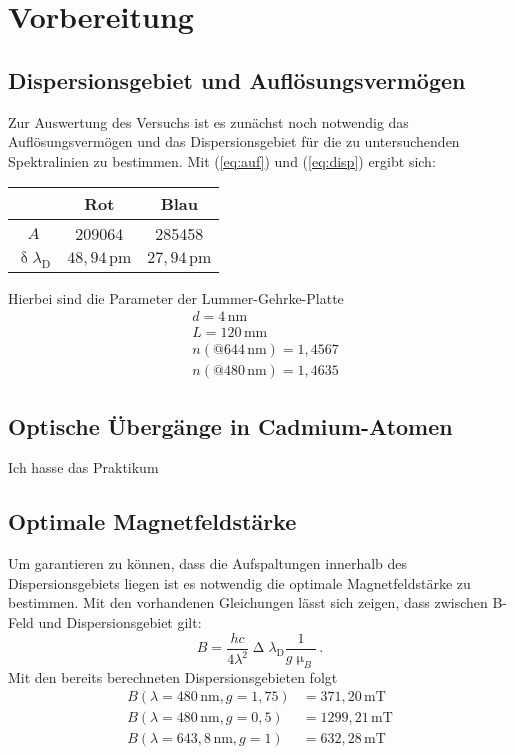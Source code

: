 \section{Vorbereitung}
\subsection{Dispersionsgebiet und Auflösungsvermögen}
Zur Auswertung des Versuchs ist es zunächst noch notwendig das Auflösungsvermögen und das Dispersionsgebiet für die zu untersuchenden Spektralinien zu bestimmen. Mit (\ref{eq:auf}) und
(\ref{eq:disp}) ergibt sich:
\begin{table}[]
\centering
\begin{tabular}{c|cc}
 & Rot  & Blau\\
 \hline
$A$ & 209064  & 285458 \\
$\updelta \lambda_\text{D}$ & $48{,}94\,\si{\pico\meter}$ &$27{,}94\,\si{\pico\meter}$
\end{tabular}
\end{table}
Hierbei sind die Parameter der Lummer-Gehrke-Platte
\begin{align}
&d=4\,\si{\nm}\nonumber\\
&L=120\,\si{\mm}\nonumber\\
&n\left(@644\,\si{\nm}\right)=1{,}4567\nonumber\\
&n\left(@480\,\si{\nm}\right)=1{,}4635\nonumber
\end{align}
\subsection{Optische Übergänge in Cadmium-Atomen}
Ich hasse das Praktikum
\subsection{Optimale Magnetfeldstärke}
Um garantieren zu können, dass die Aufspaltungen innerhalb des Dispersionsgebiets liegen ist es notwendig die optimale Magnetfeldstärke zu bestimmen. Mit den vorhandenen Gleichungen lässt sich zeigen, dass zwischen B-Feld und Dispersionsgebiet gilt:
\begin{equation}
B=\frac{hc}{4\lambda^2}\upDelta\lambda_\text{D}\frac{1}{g\upmu_B}\,.
\end{equation}
Mit den bereits berechneten Dispersionsgebieten folgt
\begin{align}
B\left(\lambda=480\,\si{\nm}, g=1{,}75\right)&=371{,}20\,\si{\milli\tesla}\nonumber\\
B\left(\lambda=480\,\si{\nm}, g=0{,}5\right)&=1299{,}21\,\si{\milli\tesla}\nonumber\\
B\left(\lambda=643{,}8\,\si{\nm}, g=1\right)&=632{,}28\,\si{\milli\tesla}\nonumber
\end{align}
